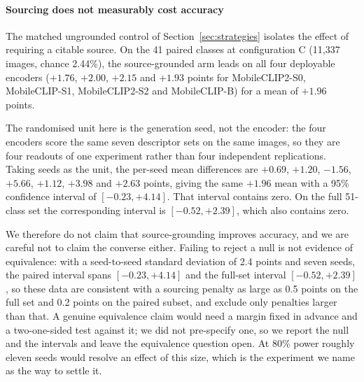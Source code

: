 \documentclass[a4paper,fleqn]{cas-dc}
\begin{document}

\paragraph{Sourcing does not measurably cost accuracy} The matched ungrounded control of
Section~\ref{sec:strategies} isolates the effect of requiring a citable source. On the 41 paired
classes at configuration C (11{,}337 images, chance 2.44\%), the source-grounded arm leads on all
four deployable encoders ($+1.76$, $+2.00$, $+2.15$ and $+1.93$ points for MobileCLIP2-S0,
MobileCLIP-S1, MobileCLIP2-S2 and MobileCLIP-B) for a mean of $+1.96$ points.

The randomised unit here is the generation seed, not the encoder: the four encoders score the same
seven descriptor sets on the same images, so they are four readouts of one experiment rather than
four independent replications. Taking seeds as the unit, the per-seed mean differences are
$+0.69$, $+1.20$, $-1.56$, $+5.66$, $+1.12$, $+3.98$ and $+2.63$ points, giving the same $+1.96$
mean with a 95\% confidence interval of $[-0.23, +4.14]$. That interval contains zero. On the full
51-class set the corresponding interval is $[-0.52, +2.39]$, which also contains zero.

We therefore do not claim that source-grounding improves accuracy, and we are careful not to
claim the converse either. Failing to reject a null is not evidence of equivalence: with a
seed-to-seed standard deviation of 2.4 points and seven seeds, the paired interval spans
$[-0.23, +4.14]$ and the full-set interval $[-0.52, +2.39]$, so these data are consistent with a
sourcing penalty as large as 0.5 points on the full set and 0.2 points on the paired subset, and
exclude only penalties larger than that. A genuine equivalence claim would need a margin fixed in advance and a two-one-sided
test against it; we did not pre-specify one, so we report the null and the intervals and
leave the equivalence question open. At 80\% power roughly eleven seeds would resolve an
effect of this size, which is the experiment we name as the way to settle it.
\end{document}
